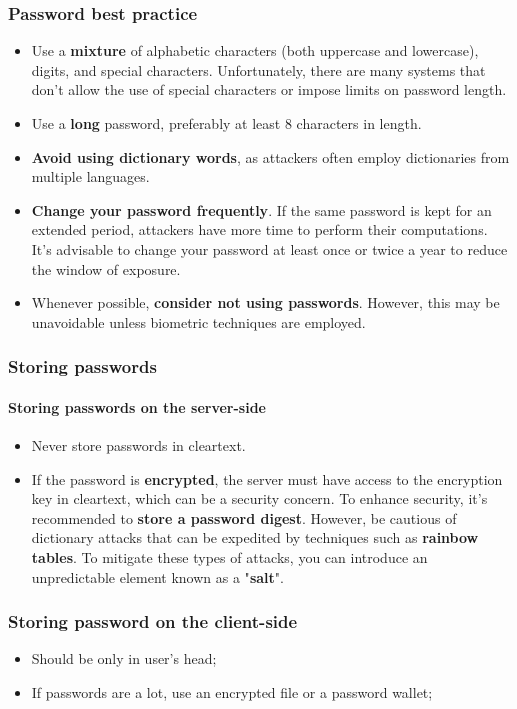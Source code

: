 \subsubsection{Password best practice}
\begin{itemize}
  \item Use a \textbf{mixture} of alphabetic characters (both uppercase and lowercase), digits, and special characters. Unfortunately, there are many systems that don't allow the use of special characters or impose limits on password length.
  \item Use a \textbf{long} password, preferably at least 8 characters in length.
  \item \textbf{Avoid using dictionary words}, as attackers often employ dictionaries from multiple languages.
  \item \textbf{Change your password frequently}. If the same password is kept for an extended period, attackers have more time to perform their computations. It's advisable to change your password at least once or twice a year to reduce the window of exposure.
  \item Whenever possible, \textbf{consider not using passwords}. However, this may be unavoidable unless biometric techniques are employed.
\end{itemize}

\subsubsection{Storing passwords}
\paragraph{Storing passwords on the server-side}
\begin{itemize}
  \item Never store passwords in cleartext.
  \item If the password is \textbf{encrypted}, the server must have access to the encryption key in cleartext, which can be a security concern. To enhance security, it's recommended to \textbf{store a password digest}. However, be cautious of dictionary attacks that can be expedited by techniques such as \textbf{rainbow tables}. To mitigate these types of attacks, you can introduce an unpredictable element known as a "\textbf{salt}".
\end{itemize}


\subsubsection{Storing password on the client-side}
\begin{itemize}
  \item Should be only in user's head;
  \item If passwords are a lot, use an encrypted file or a password wallet;
\end{itemize}

